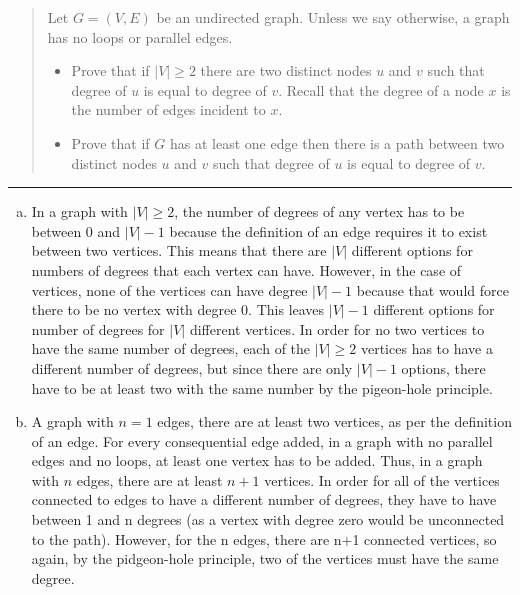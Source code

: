 \documentclass[11pt]{article}
\begin{document}



\begin{quote}
\item 
Let $G=(V,E)$ be an undirected graph. Unless we say otherwise, a graph has no loops or parallel edges.

\begin{itemize}
\item Prove that if $|V| \ge 2$ there are two distinct nodes $u$ and $v$ such that degree of $u$ is equal to degree of $v$.  Recall that the degree of a node $x$ is the number of edges incident to $x$.
\item Prove that if $G$ has at least one edge then there is a path between two distinct nodes $u$ and $v$ such that degree of $u$ is equal to degree of $v$.
\end{itemize}

\end{quote}
\hrule



\begin{solution}
\item 
\begin{enumerate}[(a)]
\item In a graph with $|V| \ge 2$, the number of degrees of any vertex has to be between 0 and $|V| - 1 $ because the definition of an edge requires it to exist between two vertices. This means that there are $|V|$ different options for numbers of degrees that each vertex can have. However, in the case of vertices, none of the vertices can have degree $|V| -1$ because that would force there to be no vertex with degree 0. 
This leaves $|V| - 1$ different options for number of degrees for $|V|$ different vertices. In order for no two vertices to have the same number of degrees, each of the $|V| \ge 2$ vertices has to have a different number of degrees, but since there are only $|V| - 1$ options, there have to be at least two with the same number by the pigeon-hole principle.
\item
A graph with $n = 1$ edges, there are at least two vertices, as per the definition of an edge. For every consequential edge added, in a graph with no parallel edges and no loops, at least one vertex has to be added. Thus, in a graph with $n$ edges, there are at least $n+1$ vertices.  In order for all of the vertices connected to edges to have a different number of degrees, they have to have between 1 and n degrees (as a vertex with degree zero would be unconnected to the path). However, for the n edges, there are n+1 connected vertices, so again, by the pidgeon-hole principle, two of the vertices must have the same degree.
\end{enumerate}
\end{solution}
\end{document}

